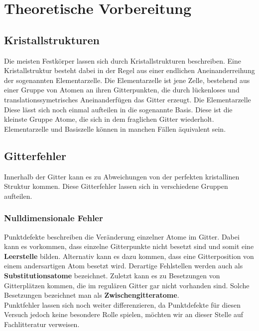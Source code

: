﻿\section{Theoretische Vorbereitung}
    \subsection{Kristallstrukturen}
        Die meisten Festkörper lassen sich durch Kristallstrukturen beschreiben. Eine Kristallstruktur besteht
        dabei in der Regel aus einer endlichen Aneinanderreihung der sogenannten Elementarzelle. Die Elementarzelle ist
        jene Zelle, bestehend aus einer Gruppe von Atomen an ihren Gitterpunkten, die durch lückenloses und translationssymetrisches Aneinanderfügen das Gitter erzeugt. Die Elementarzelle
        Diese lässt sich noch einmal aufteilen in die sogenannte Basis. Diese ist die kleinste Gruppe Atome, die
        sich in dem fraglichen Gitter wiederholt. Elementarzelle und Basiszelle können in manchen Fällen äquivalent sein.
    \subsection{Gitterfehler}
        Innerhalb der Gitter kann es zu Abweichungen von der perfekten kristallinen Struktur kommen. Diese Gitterfehler lassen
        sich in verschiedene Gruppen aufteilen.
        \subsubsection*{Nulldimensionale Fehler}
            Punktdefekte beschreiben die Veränderung einzelner Atome im Gitter. Dabei kann es vorkommen, dass 
            einzelne Gitterpunkte nicht besetzt sind und somit eine \textbf{Leerstelle} bilden.
            Alternativ kann es dazu kommen, dass eine Gitterposition von einem andersartigen Atom besetzt wird.
            Derartige Fehlstellen werden auch als \textbf{Substitutionsatome} bezeichnet.
            Zuletzt kann es zu Besetzungen von Gitterplätzen kommen, die im regulären Gitter gar nicht vorhanden sind.
            Solche Besetzungen bezeichnet man als \textbf{Zwischengitteratome}.\\
            Punktfehler lassen sich noch weiter differenzieren, da Punktdefekte für diesen Versuch jedoch keine besondere
            Rolle spielen, möchten wir an dieser Stelle auf Fachlitteratur verweisen.
